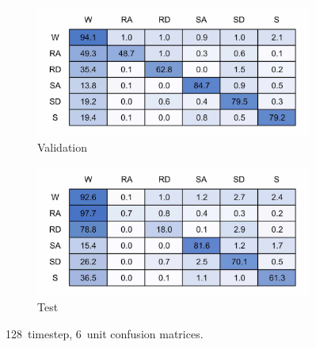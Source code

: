 \begin{figure}[!hbt]
     \centering
    \begin{subfigure}{.45\textwidth}
    \centering
        \includegraphics[width=\textwidth]{content/4-LSTM_Behaviour/results/conf_matricies/Training_128x6_NT.jpg}
        \caption{Validation}
        \label{fig:full_model_conf_matrix_training_128x6}
    \end{subfigure}
    \begin{subfigure}{.45\textwidth}
    \centering
        \includegraphics[width=\textwidth]{content/4-LSTM_Behaviour/results/conf_matricies/Test_128x6_NT.jpg}
        \caption{Test}
        \label{fig:full_model_conf_matrix_test_128x6}
    \end{subfigure}
    \caption{128~timestep, 6~unit confusion matrices.}
    \label{fig:128x6_full_model_confusion_matrix}
\end{figure}

